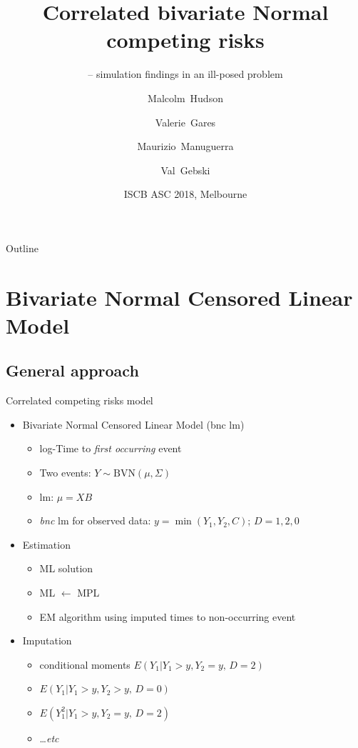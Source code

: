 \documentclass{beamer}
\title{Correlated bivariate Normal competing risks%
}
\subtitle{ -- simulation findings in an ill-posed problem}
\author{Malcolm~Hudson\inst{1,2} \and Valerie~Gares \inst{3} \and Maurizio~Manuguerra\inst{1} \and Val~Gebski\inst{2}}
\institute
{
  \inst{1}%
  Macquarie University
  \and
  \inst{2}%
  NHMRC Clinical Trials Centre\\
  University of Sydney
  \and
  \inst{3}%
  INSA Rennes
}
\date{ISCB ASC 2018, Melbourne}
\begin{document}
\begin{frame}
  \titlepage
\end{frame}

\begin{frame}{Outline}
  \tableofcontents
\end{frame}

\section{Bivariate Normal Censored Linear Model}

\subsection{General approach}

\begin{frame}{Correlated competing risks model}
  \begin{itemize}
  \item
    Bivariate Normal Censored Linear Model (bnc lm)
    \begin{itemize}
    \item
      log-Time to \emph{first occurring} event
    \item
      Two events: $Y \sim \mbox{BVN}(\mu,\Sigma) $
    \item
      lm: $\mu = X B$
    \item
      \emph{bnc} lm for observed data: $y=\min (Y_1, Y_2, C)$;  $D=1,2,0$
    \end{itemize}
  \item
    Estimation
    \begin{itemize}
    \item ML solution 
    \item
      ML $\leftarrow$  MPL
    \item
      EM algorithm using imputed times to non-occurring event
    \end{itemize}
  \item 
    Imputation
    \begin{itemize}
    \item conditional moments
      \( E (Y_1| Y_1 > y, Y_2=y, \, D=2) \)
    \item
      \( E (Y_1| Y_1 > y, Y_2 > y, \, D=0) \)
    \item 
    \( E (Y_1^2| Y_1> y, Y_2=y,\, D=2) \) 
    \item
    \ldots \emph{etc}
    \end{itemize}
  \end{itemize}
\end{frame}
\end{document}
